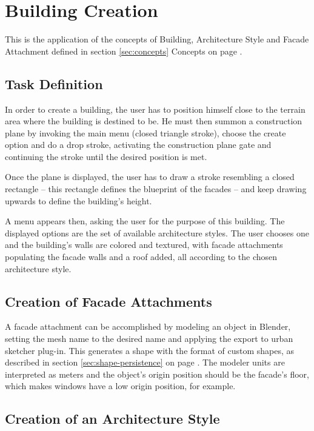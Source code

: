 
\section{Building Creation}

This is the application of the concepts of Building, Architecture Style and
Facade Attachment defined in section \ref{sec:concepts} Concepts on page \pageref{sec:concepts}.

\subsection{Task Definition}

In order to create a building, the user has to position himself close to the terrain area
where the building is destined to be.
He must then summon a construction plane by invoking the main menu (closed triangle stroke),
choose the create option and do a drop stroke, activating the construction plane gate and
continuing the stroke until the desired position is met.


Once the plane is displayed, the user has to draw a stroke resembling a closed rectangle
-- this rectangle defines the blueprint of the facades --
and keep drawing upwards to define the building's height.

A menu appears then, asking the user for the purpose of this building.
The displayed options are the set of available architecture styles.
The user chooses one and the building's walls are colored and textured,
with facade attachments populating the facade walls and a roof added,
all according to the chosen architecture style.


\subsection{Creation of Facade Attachments}

A facade attachment can be accomplished by modeling an object in Blender,
setting the mesh name to the desired name and applying the export to urban sketcher plug-in.
This generates a shape with the format of custom shapes, as described in section \ref{sec:shape-persistence}
on page \pageref{sec:shape-persistence}.
The modeler units are interpreted as meters and the object's origin position should be the facade's floor,
which makes windows have a low origin position, for example.


\subsection{Creation of an Architecture Style}


